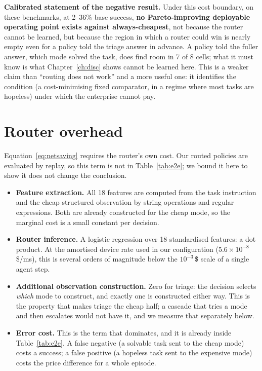 \begin{scopebox}
\textbf{Calibrated statement of the negative result.} Under this cost boundary,
on these benchmarks, at 2--36\% base success, \textbf{no Pareto-improving deployable operating point exists against
always-cheapest}, not because the router cannot be learned, but
because the region in which a router could win is nearly empty even for a policy
told the triage answer in advance. A policy told the fuller answer, which mode
solved the task, does find room in 7 of 8 cells; what it must know is what
Chapter~\ref{ch:disc} shows cannot be learned here. This is a weaker claim than ``routing does not work''
and a more useful one: it identifies the condition (a cost-minimising fixed
comparator, in a regime where most tasks are hopeless) under which the enterprise
cannot pay.
\end{scopebox}

\FloatBarrier
\section{Router overhead}
\label{sec:overhead}

Equation~\ref{eq:netsaving} requires the router's own cost. Our routed policies
are evaluated by replay, so this term is not in Table~\ref{tab:e2e}; we bound it
here to show it does not change the conclusion.

\begin{itemize}[leftmargin=1.5em]
\item \textbf{Feature extraction.} All 18 features are computed from the task
      instruction and the cheap structured observation by string operations and
      regular expressions. Both are already constructed for the cheap mode, so
      the marginal cost is a small constant per decision.
\item \textbf{Router inference.} A logistic regression over 18 standardised
      features: a dot product. At the amortised device rate used in our
      configuration ($5.6\times10^{-8}$\,\$/ms), this is several orders of
      magnitude below the $10^{-3}$\,\$ scale of a single agent step.
\item \textbf{Additional observation construction.} Zero for triage: the
      decision selects \emph{which} mode to construct, and exactly one is
      constructed either way. This is the property that makes triage the cheap
      half; a cascade that tries a mode and then escalates would not have it,
      and we measure that separately below.
\item \textbf{Error cost.} This is the term that dominates, and it is already
      inside Table~\ref{tab:e2e}. A false negative (a solvable task sent to the
      cheap mode) costs a success; a false positive (a hopeless task sent to the
      expensive mode) costs the price difference for a whole episode.
\end{itemize}

